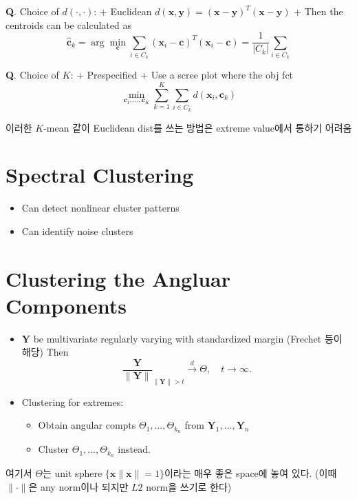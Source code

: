 \documentclass[
  letterpaper,
  DIV=11,
  numbers=noendperiod]{scrreprt}
\providecommand{\tightlist}{%
  \setlength{\itemsep}{0pt}\setlength{\parskip}{0pt}}
\theoremstyle{definition}
\theoremstyle{plain}
\theoremstyle{plain}
\theoremstyle{definition}
\theoremstyle{plain}
\theoremstyle{definition}
\theoremstyle{remark}
\begin{document}
\textbf{Q}. Choice of \(d(\cdot, \cdot)\): + Euclidean
\(d(\pmb{x}, \pmb{y}) = (\pmb{x}- \pmb{y})^T(\pmb{x}- \pmb{y})\) + Then
the centroids can be calculated as \[
  \hat{\pmb{c}}_k = \arg\min_{\pmb{c}} \sum_{i\in C_k}(\pmb{x}_i - \pmb{c})^T(\pmb{x}_i - \pmb{c}) = \frac{1}{|C_k|} \sum_{i\in C_k}
  \]

\textbf{Q}. Choice of \(K\): + Prespecified + Use a scree plot where the
obj fct \[
  \min_{\pmb{c}_1, \ldots, \pmb{c}_K} \sum_{k=1}^K \sum_{i \in C_k} d(\pmb{x}_i , \pmb{c}_k)
  \]

이러한 \(K\)-mean 같이 Euclidean dist를 쓰는 방법은 extreme value에서
통하기 어려움

\section{Spectral Clustering}\label{spectral-clustering}

\begin{itemize}
\item
  Can detect nonlinear cluster patterns
\item
  Can identify noise clusters
\end{itemize}

\section{Clustering the Angluar
Components}\label{clustering-the-angluar-components}

\begin{itemize}
\item
  \(\pmb{Y}\) be multivariate regularly varying with standardized margin
  (Frechet 등이 해당) Then \[
  \frac{\pmb{Y}}{\|\pmb{Y}\|}_{\| \pmb{Y}\|>t}\stackrel{d}{\rightarrow} \Theta, \quad{} t \rightarrow \infty.
  \]
\item
  Clustering for extremes:

  \begin{itemize}
  \tightlist
  \item
    Obtain angular compts \(\Theta_1, \ldots, \Theta_{k_n}\) from
    \(\pmb{Y}_1, \ldots , \pmb{Y}_n\)
  \item
    Cluster \(\Theta_1, \ldots, \Theta_{k_n}\) instead.
  \end{itemize}
\end{itemize}

여기서 \(\Theta\)는 unit sphere \(\{ \pmb{x} \| \pmb{x} \| = 1\}\)이라는
매우 좋은 space에 놓여 있다. (이때 \(\| \cdot \|\)은 any norm이나 되지만
\(L2\) norm을 쓰기로 한다)
\end{document}

